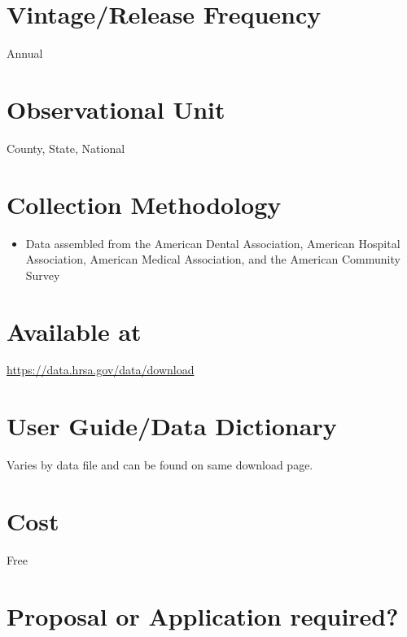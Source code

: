 \documentclass[
]{book}
\providecommand{\tightlist}{%
  \setlength{\itemsep}{0pt}\setlength{\parskip}{0pt}}
\begin{document}
\hypertarget{vintagerelease-frequency-11}{%
\section{Vintage/Release Frequency}\label{vintagerelease-frequency-11}}

Annual

\hypertarget{observational-unit-11}{%
\section{Observational Unit}\label{observational-unit-11}}

County, State, National

\hypertarget{collection-methodology-11}{%
\section{Collection Methodology}\label{collection-methodology-11}}

\begin{itemize}
\tightlist
\item
  Data assembled from the American Dental Association, American Hospital Association, American Medical Association, and the American Community Survey
\end{itemize}

\hypertarget{available-at-11}{%
\section{Available at}\label{available-at-11}}

\url{https://data.hrsa.gov/data/download}

\hypertarget{user-guidedata-dictionary-11}{%
\section{User Guide/Data Dictionary}\label{user-guidedata-dictionary-11}}

Varies by data file and can be found on same download page.

\hypertarget{cost-11}{%
\section{Cost}\label{cost-11}}

Free

\hypertarget{proposal-or-application-required-11}{%
\section{Proposal or Application required?}\label{proposal-or-application-required-11}}
\end{document}
